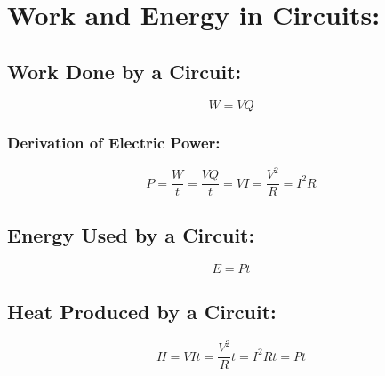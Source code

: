 \documentclass[a4paper]{report}
\begin{document}
    \section{Work and Energy in Circuits:}
        \subsection{Work Done by a Circuit:}
            \begin{equation}
                W = VQ
            \end{equation}
        \subsubsection{Derivation of Electric Power:}
            \begin{equation}
                P = \frac{W}{t} = \frac{VQ}{t} = VI = \frac{V^2}{R} = I^2 R 
            \end{equation}
        \subsection{Energy Used by a Circuit:}
            \begin{equation}
                E = Pt
            \end{equation}
        \subsection{Heat Produced by a Circuit:}
            \begin{equation}
                H = VIt = \frac{V^2}{R}t = I^2 Rt = Pt
            \end{equation}
\end{document}
